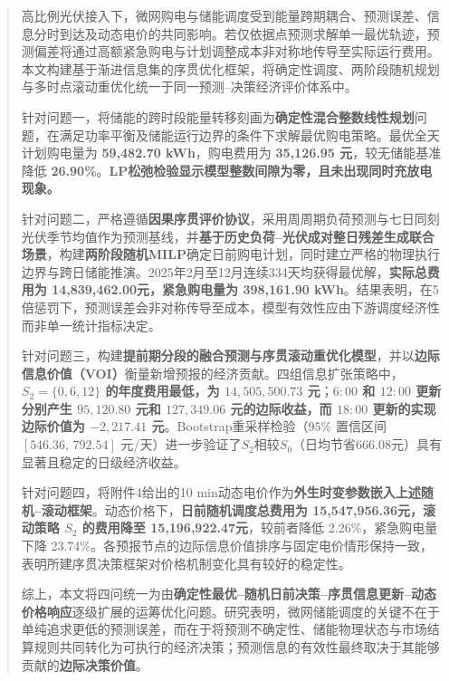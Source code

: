 \begin{abstract}

高比例光伏接入下，微网购电与储能调度受到能量跨期耦合、预测误差、信息分时到达及动态电价的共同影响。若仅依据点预测求解单一最优轨迹，预测偏差将通过高额紧急购电与计划调整成本非对称地传导至实际运行费用。本文构建基于渐进信息集的序贯优化框架，将确定性调度、两阶段随机规划与多时点滚动重优化统一于同一预测--决策经济评价体系中。

针对问题一，将储能的跨时段能量转移刻画为\textbf{确定性混合整数线性规划}问题，在满足功率平衡及储能运行边界的条件下求解最优购电策略。最优全天计划购电量为 \textbf{59,482.70 kWh}，购电费用为 \textbf{35,126.95 元}，较无储能基准降低 \textbf{26.90\%}。\textbf{LP松弛检验显示模型整数间隙为零，且未出现同时充放电现象。}

针对问题二，严格遵循\textbf{因果序贯评价协议}，采用周周期负荷预测与七日同刻光伏季节均值作为预测基线，并\textbf{基于历史负荷--光伏成对整日残差生成联合场景}，构建\textbf{两阶段随机MILP}确定日前购电计划，同时建立严格的物理执行边界与跨日储能推演。2025年2月至12月连续334天均获得最优解，\textbf{实际总费用为 14,839,462.00元，紧急购电量为 398,161.90 kWh}。结果表明，在5倍惩罚下，预测误差会非对称传导至成本，模型有效性应由下游调度经济性而非单一统计指标决定。

针对问题三，构建\textbf{提前期分段的融合预测与序贯滚动重优化模型}，并以\textbf{边际信息价值（VOI）}衡量新增预报的经济贡献。四组信息扩张策略中，\textbf{$S_2=\{0,6,12\}$ 的年度费用最低，为 $14,505,500.73$ 元}；\textbf{$6{:}00$ 和 $12{:}00$ 更新分别产生 $95,120.80$ 元和 $127,349.06$ 元的边际收益，而 $18{:}00$ 更新的实现边际价值为 $-2,217.41$ 元}。Bootstrap重采样检验（$95\%$ 置信区间 $[546.36,\,792.54]$ 元/天）进一步验证了$S_2$相较$S_0$（日均节省$666.08$元）具有显著且稳定的日级经济收益。

针对问题四，将附件4给出的10 min动态电价作为\textbf{外生时变参数嵌入上述随机--滚动框架}。动态价格下，\textbf{日前随机调度总费用为 15,547,956.36元，滚动策略 $S_2$ 的费用降至 15,196,922.47元}，较前者降低 2.26\%，紧急购电量下降 23.74\%。各预报节点的边际信息价值排序与固定电价情形保持一致，表明所建序贯决策框架对价格机制变化具有较好的稳定性。

综上，本文将四问统一为由\textbf{确定性最优--随机日前决策--序贯信息更新--动态价格响应}逐级扩展的运筹优化问题。研究表明，微网储能调度的关键不在于单纯追求更低的预测误差，而在于将预测不确定性、储能物理状态与市场结算规则共同转化为可执行的经济决策；预测信息的有效性最终取决于其能够贡献的\textbf{边际决策价值}。


\end{abstract}
